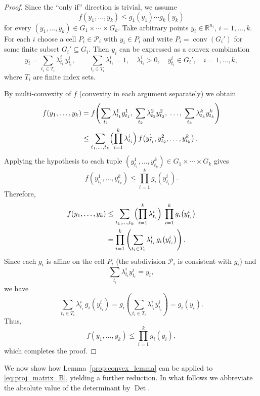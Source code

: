 \documentclass[11pt]{amsart}
\theoremstyle{definition}
\theoremstyle{remark}
\newcommand{\Det}{\operatorname{Det}}
\begin{document}
\begin{proof}
Since the ``only if'' direction is trivial, we assume
\[
f(y_1,\ldots,y_k) \le g_1(y_1)\cdots g_k(y_k)
\]
for every $(y_1,\ldots,y_k)\in G_1\times\cdots\times G_k$. Take arbitrary points
$y_i\in\mathbb{R}^{n_i}$, $i=1,\ldots,k$. For each $i$ choose a cell $P_i\in\mathcal{P}_i$ with $y_i\in P_i$ and write $P_i=\operatorname{conv}(G_i')$ for some finite subset $G_i'\subseteq G_i$. Then $y_i$ can be expressed as a convex combination
\[
y_i = \sum_{t_i\in T_i} \lambda_{t_i}^{i} \, y_{t_i}^{i},
\qquad
\sum_{t_i\in T_i}\lambda_{t_i}^{i} = 1,\quad \lambda_{t_i}^{i}>0,\quad y_{t_i}^{i}\in G_i', \quad  i=1,\ldots,k, 
\]
where $T_i$ are finite index sets.

By multi‑convexity of $f$ (convexity in each argument separately) we obtain
\begin{align*}
f(y_1,\ldots,y_k)
&= f\!\left(\sum_{t_1}\lambda_{t_1}^{1}y_{t_1}^{1},\;
          \sum_{t_2}\lambda_{t_2}^{2}y_{t_2}^{2},\;\ldots,\;
          \sum_{t_k}\lambda_{t_k}^{k}y_{t_k}^{k}\right) \\
&\le \sum_{t_1,\ldots,t_k} \Bigl(\prod_{i=1}^k \lambda_{t_i}^{i}\Bigr)\,
      f\!\left(y_{t_1}^{1},y_{t_2}^{2},\ldots,y_{t_k}^{k}\right).
\end{align*}
Applying the hypothesis to each tuple $(y_{t_1}^{1},\ldots,y_{t_k}^{k})\in G_1\times\cdots\times G_k$ gives
\[
f\!\left(y_{t_1}^{1},\ldots,y_{t_k}^{k}\right)
\le \prod_{i=1}^k g_i\!\left(y_{t_i}^{i}\right).
\]
Therefore,
\begin{align*}
f(y_1,\ldots,y_k)
&\le \sum_{t_1,\ldots,t_k} \Bigl(\prod_{i=1}^k \lambda_{t_i}^{i}\Bigr)\;
      \prod_{i=1}^k g_i\!\left(y_{t_i}^{i}\right) \\
&= \prod_{i=1}^k \left( \sum_{t_i\in T_i} \lambda_{t_i}^{i}\, g_i\!\left(y_{t_i}^{i}\right) \right).
\end{align*}
Since each $g_i$ is affine on the cell $P_i$ (the subdivision $\mathcal{P}_i$ is consistent with $g_i$) and 
\[
\sum_{t_i}\lambda_{t_i}^{i}y_{t_i}^{i}=y_i,
\]
we have
\[
\sum_{t_i\in T_i} \lambda_{t_i}^{i}\, g_i\!\left(y_{t_i}^{i}\right)
= g_i\!\left(\sum_{t_i\in T_i} \lambda_{t_i}^{i}y_{t_i}^{i}\right)
= g_i(y_i).
\]
Thus,
\[
f(y_1,\ldots,y_k) \le \prod_{i=1}^k g_i(y_i),
\]
which completes the proof. 
\end{proof}

We now show how  Lemma~\eqref{prop:convex_lemma} can be applied to 
\eqref{eq:proj_matrix_B}, yielding a further reduction. In what follows we abbreviate the absolute value of the determinant by $\Det$.
\end{document}
